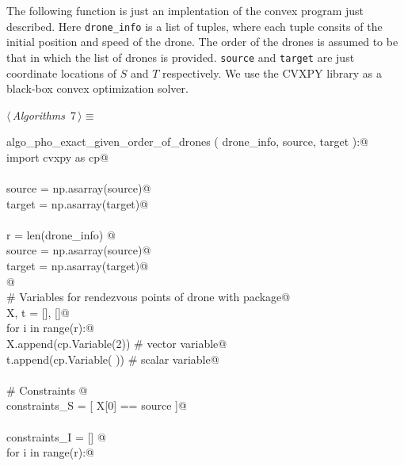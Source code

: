 \documentclass[12pt, english, oneside]{report}
\begin{document}
The following function is just an implentation of the convex program just described. 
Here \verb|drone_info| is a list 
of tuples, where each tuple consits of the initial position and speed of the drone. The order of the 
drones is assumed to be that in which the list of drones is provided. \verb|source| and \verb|target|
are just coordinate locations of $S$ and $T$ respectively. We use the CVXPY \cite{cvxpy} library 
as a black-box convex optimization solver. 

\begin{flushleft} \small\label{scrap2}\raggedright\small
{} $\langle\,${\itshape Algorithms}\nobreak\ {\footnotesize {7}}$\,\rangle\equiv$
\vspace{-1ex}
\begin{list}{}{} \item
\mbox{}\verb@def algo_pho_exact_given_order_of_drones ( drone_info, source, target ):@\\
\mbox{}\verb@    import cvxpy as cp@\\
\mbox{}\verb@@\\
\mbox{}\verb@    source = np.asarray(source)@\\
\mbox{}\verb@    target = np.asarray(target)@\\
\mbox{}\verb@@\\
\mbox{}\verb@    r = len(drone_info) @\\
\mbox{}\verb@    source = np.asarray(source)@\\
\mbox{}\verb@    target = np.asarray(target)@\\
\mbox{}\verb@    @\\
\mbox{}\verb@    # Variables for rendezvous points of drone with package@\\
\mbox{}\verb@    X, t = [], []@\\
\mbox{}\verb@    for i in range(r):@\\
\mbox{}\verb@       X.append(cp.Variable(2)) # vector variable@\\
\mbox{}\verb@       t.append(cp.Variable( )) # scalar variable@\\
\mbox{}\verb@@\\
\mbox{}\verb@    # Constraints @\\
\mbox{}\verb@    constraints_S = [  X[0] == source ]@\\
\mbox{}\verb@@\\
\mbox{}\verb@    constraints_I = [] @\\
\mbox{}\verb@    for i in range(r):@\\

\end{list}
\end{flushleft}
\end{document}
